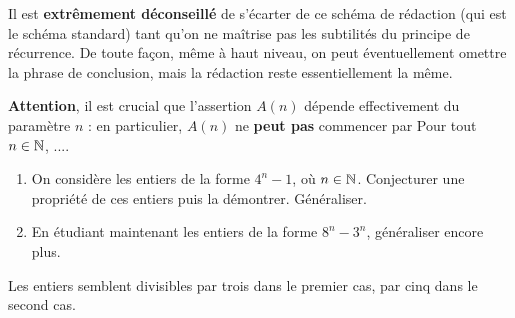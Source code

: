 Il est \textbf{extrêmement déconseillé} de s'écarter de ce schéma de rédaction (qui est le schéma standard) tant qu'on ne maîtrise pas les subtilités du principe de récurrence. De toute façon, même à haut niveau, on peut éventuellement omettre la phrase de conclusion, mais la rédaction reste essentiellement la même.

\begin{mdframed}
\textbf{Attention}, il est crucial que l'assertion $A(n)$ dépende effectivement du paramètre $n$ : en particulier, $A(n)$ ne \textbf{peut pas} commencer par \og Pour tout $n\in \mathbb N$, ...\fg.
\end{mdframed}

\begin{exo}[Divisibilité]
\begin{enumerate}
\item On considère les entiers de la forme  $4^n-1$, où $n \in \mathbb N$. Conjecturer une propriété de ces entiers puis la démontrer. Généraliser.%
\item En étudiant maintenant les entiers de la forme $8^n-3^n$, généraliser encore plus.
\end{enumerate}
\begin{hint}
Les entiers semblent divisibles par trois dans le premier cas, par cinq dans le second cas.
\end{hint}

\begin{sol}
\begin{center}
\end{center}


\end{sol}
\end{exo}
